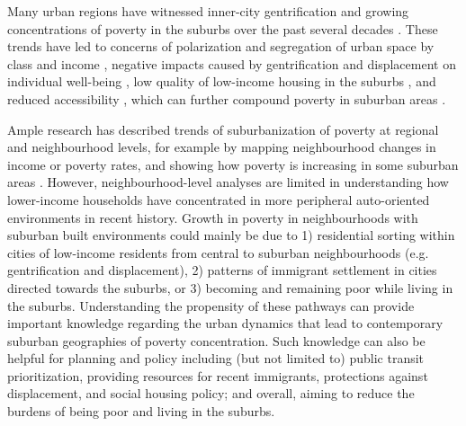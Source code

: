 Many urban regions have witnessed inner-city gentrification and growing concentrations of poverty in the suburbs over the past several decades \cite{ehrenhalt_great_2012,ades_are_2012,grant_changing_2020}. These trends have led to concerns of polarization and segregation of urban space by class and income \cite{hulchanski_three_2010}, negative impacts caused by gentrification and displacement on individual well-being \cite{elliott-cooper_moving_2020}, low quality of low-income housing in the suburbs \cite{august_gentrification_2018}, and reduced accessibility \cite{allen_planning_2020}, which can further compound poverty in suburban areas \cite{lucas_transport_2012}.

Ample research has described trends of suburbanization of poverty at regional and neighbourhood levels, for example by mapping neighbourhood changes in income or poverty rates, and showing how poverty is increasing in some suburban areas \cite{hulchanski_three_2010,ades_are_2012,breau_pulling_2018,grant_changing_2020}. However, neighbourhood-level analyses are limited in understanding how lower-income households have concentrated in more peripheral auto-oriented environments in recent history. Growth in poverty in neighbourhoods with suburban built environments could mainly be due to 1) residential sorting within cities of low-income residents from central to suburban neighbourhoods (e.g. gentrification and displacement), 2) patterns of immigrant settlement in cities directed towards the suburbs, or 3) becoming and remaining poor while living in the suburbs.  Understanding the propensity of these pathways can provide important knowledge regarding the urban dynamics that lead to contemporary suburban geographies of poverty concentration. Such knowledge can also be helpful for planning and policy including (but not limited to) public transit prioritization, providing resources for recent immigrants, protections against displacement, and social housing policy; and overall, aiming to reduce the burdens of being poor and living in the suburbs.

